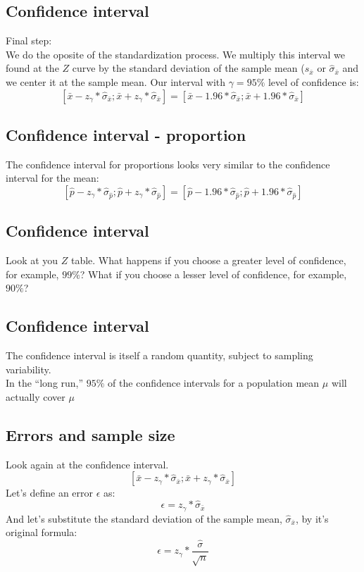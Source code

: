 \documentclass[11pt]{article}
\begin{document}
	\subsection*{Confidence interval}
	Final step:
	\newline\\
	We do the oposite of the standardization process. We multiply this interval we found at the $Z$ curve by the standard deviation of the sample mean ($s_{\bar{x}}$ or $\hat{\sigma}_{\bar{x}}$ and we center it at the sample mean. Our interval with $\gamma = 95\%$ level of confidence is:
	\[[\bar{x}-z_\gamma*\hat{\sigma}_{\bar{x}};\bar{x}+z_\gamma*\hat{\sigma}_{\bar{x}}] = [\bar{x}-1.96*\hat{\sigma}_{\bar{x}};\bar{x}+1.96*\hat{\sigma}_{\bar{x}}]\]

	\subsection*{Confidence interval - proportion}
	The confidence interval for proportions looks very similar to the confidence interval for the mean:
	\[[\hat{p}-z_\gamma*\hat{\sigma}_{\hat{p}};\hat{p}+z_\gamma*\hat{\sigma}_{\hat{p}}]=[\hat{p}-1.96*\hat{\sigma}_{\hat{p}};\hat{p}+1.96*\hat{\sigma}_{\hat{p}}]\]

	\subsection*{Confidence interval}
	Look at you $Z$ table. What happens if you choose a greater level of confidence, for example, $99\%$? What if you choose a lesser level of confidence, for example, $90\%$? 

	\subsection*{Confidence interval}
The confidence interval is itself a random quantity, subject to sampling variability.
\newline\\
In the “long run,” $95\%$ of the confidence intervals for a population mean $\mu$ will actually cover $\mu$

	\subsection*{Errors and sample size}
	Look again at the confidence interval.
	\newline\\
	\[[\bar{x}-z_\gamma*\hat{\sigma}_{\bar{x}};\bar{x}+z_\gamma*\hat{\sigma}_{\bar{x}}]\]
	Let's define an error $\epsilon$ as:
	\[\epsilon=z_\gamma*\hat{\sigma}_{\bar{x}}\]	
	And let's substitute the standard deviation of the sample mean, $\hat{\sigma}_{\bar{x}}$, by it's original formula:
	\[\epsilon=z_\gamma*\frac{\hat{\sigma}}{\sqrt{n}}\]	
\end{document}
